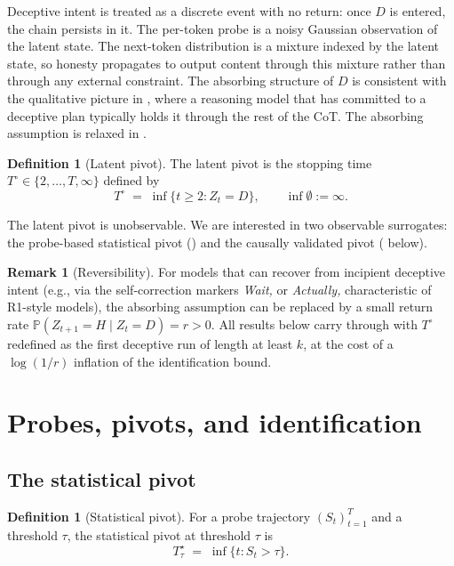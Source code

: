 \documentclass[11pt]{article}
\theoremstyle{definition}
\newtheorem{definition}[theorem]{Definition}
\newtheorem{remark}[theorem]{Remark}
\newcommand{\Prob}{\mathbb{P}}
\newcommand{\1}{\mathbf{1}}
\begin{document}
Deceptive intent is treated as a discrete event with no return: once $D$ is entered, the chain persists in it. The per-token probe is a noisy Gaussian observation of the latent state. The next-token distribution is a mixture indexed by the latent state, so honesty propagates to output content through this mixture rather than through any external constraint. The absorbing structure of $D$ is consistent with the qualitative picture in \citet{baker2025monitoring}, where a reasoning model that has committed to a deceptive plan typically holds it through the rest of the CoT. The absorbing assumption is relaxed in .

\begin{definition}[Latent pivot]
\label{def:latent-pivot}
The latent pivot is the stopping time $T^{\circ} \in \{2, \dots, T, \infty\}$ defined by
\[
T^{\circ} \;=\; \inf\{t \ge 2 : Z_t = D\}, \qquad \inf \emptyset := \infty.
\]
\end{definition}

The latent pivot is unobservable. We are interested in two observable surrogates: the probe-based statistical pivot () and the causally validated pivot ( below).

\begin{remark}[Reversibility]
\label{rem:reversible}
For models that can recover from incipient deceptive intent (e.g., via the self-correction markers \emph{Wait,} or \emph{Actually,} characteristic of R1-style models), the absorbing assumption can be replaced by a small return rate $\Prob(Z_{t+1} = H \mid Z_t = D) = r > 0$. All results below carry through with $T^{\circ}$ redefined as the first deceptive run of length at least $k$, at the cost of a $\log(1/r)$ inflation of the identification bound.
\end{remark}

\section{Probes, pivots, and identification}
\label{sec:identification}

\subsection{The statistical pivot}

\begin{definition}[Statistical pivot]
\label{def:stat-pivot}
For a probe trajectory $(S_t)_{t=1}^{T}$ and a threshold $\tau$, the statistical pivot at threshold $\tau$ is
\[
T^{\star}_{\tau} \;=\; \inf\{t : S_t > \tau\}.
\]
\end{definition}
\end{document}
